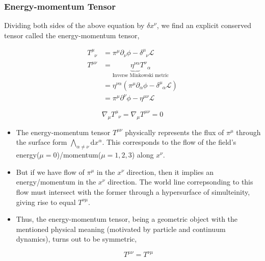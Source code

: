 \documentclass{beamer}
\begin{document}
\begin{frame}
\frametitle{Energy-momentum Tensor}

\begin{corollary}

Dividing both sides of the above equation by $\delta x^\nu$, we find an explicit conserved tensor called the energy-momentum tensor,

\begin{align*}
T^\mu_{\phantom{\mu} \nu} & = \pi^\mu \partial_\nu \phi - \delta^\mu_{\phantom{\mu} \nu} \mathcal{L} \\
T^{\mu \nu} & = \underset{\text{Inverse Minkowski metric}}{\underbrace{\eta^{\nu \alpha}} T^\nu_{\phantom{\mu} \alpha}} \\
& = \eta^{\nu \alpha} \left( \pi^\mu \partial_\alpha \phi - \delta^\mu_{\phantom{\mu} \alpha} \mathcal{L} \right) \\
& = \pi^\mu \partial^\nu \phi - \eta^{\mu \nu} \mathcal{L}
\end{align*}

$$\boxed{\nabla_\mu T^\mu_{\phantom{\mu} \nu} = \nabla_\mu T^{\mu \nu} = 0}$$
\end{corollary}
\end{frame}

\begin{frame}
\begin{itemize}
\item The energy-momentum tensor $T^{\mu \nu}$ physically represents the flux of $\pi^\mu$ through the surface form $\bigwedge \limits_{\alpha \neq \nu} \text{d} x^\alpha$. This corresponds to the flow of the field's energy($\mu = 0$)/momentum($\mu = 1, 2, 3$) along $x^\nu$.

\item But if we have flow of $\pi^\mu$ in the $x^\nu$ direction, then it implies an energy/momentum in the $x^\nu$ direction. The world line correpsonding to this flow must intersect with the former through a hypersurface of simulteinity, giving rise to equal $T^{\nu \mu}$. 

\item Thus, the energy-momentum tensor, being a geometric object with the mentioned physical meaning (motivated by particle and continuum dynamics), turns out to be symmetric,

$$\boxed{T^{\mu \nu} = T^{\nu \mu}}$$
\end{itemize}
\end{frame}
\end{document}
